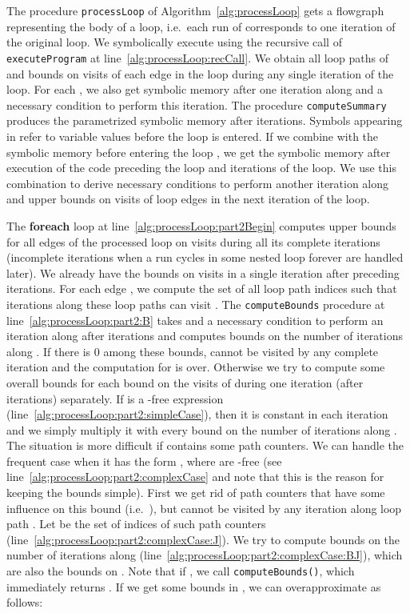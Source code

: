 \documentclass[10pt,a4paper]{article}
\begin{document}
The procedure \texttt{processLoop} of Algorithm~\ref{alg:processLoop} gets a
flowgraph  representing the body of a loop, i.e.~each run of 
corresponds to one iteration of the original loop. We symbolically execute
 using the recursive call of \texttt{executeProgram} at
line~\ref{alg:processLoop:recCall}. We obtain all loop paths
 of  and bounds  on visits
of each edge in the loop during any single iteration of the loop. For each
, we also get symbolic memory  after one iteration along
 and a necessary condition  to perform this iteration.
The procedure \texttt{computeSummary} produces the parametrized symbolic
memory  after
 iterations.
Symbols  appearing in  refer to variable
values before the loop is entered. If we combine 
with the symbolic memory before entering the loop , we
get the symbolic memory after execution of the code preceding the loop and
 iterations of the loop. We use this combination to derive
necessary conditions  to perform another iteration
along  and upper bounds  on visits of loop
edges in the next iteration of the loop. 

The \textbf{foreach} loop at
line~\ref{alg:processLoop:part2Begin} computes upper bounds for all edges of the processed loop on visits during
all its complete iterations (incomplete iterations when a run cycles in
some nested loop forever are handled later). We already have the bounds
 on visits in a single iteration after 
preceding iterations.
For each edge , we compute the set  of all loop path indices such that
iterations along these loop paths can visit . 
The \texttt{computeBounds} procedure at line~\ref{alg:processLoop:part2:B}
takes  and a necessary condition to perform an iteration along  after
 iterations and computes bounds  on the
number of iterations along . If there is 0 among these bounds,  cannot
be visited by any complete iteration and the computation for  is
over. Otherwise we try to compute some overall bounds for each bound
 on the visits of  during one iteration (after
 iterations) separately. If  is a
-free expression
(line~\ref{alg:processLoop:part2:simpleCase}), then it is constant in each
iteration and we simply multiply it with every bound on the number of
iterations along . The situation is more difficult if
 contains some path counters. We can handle the
frequent case when it has the form
, where  are
-free (see line~\ref{alg:processLoop:part2:complexCase} and
note that this is the reason for keeping the bounds simple). First we
get rid of path counters  that have some influence on this bound
(i.e.~), but  cannot be visited by any iteration along loop
path . Let  be the set of indices of such path counters
(line~\ref{alg:processLoop:part2:complexCase:J}). We try to compute bounds
 on the number of iterations along 
(line~\ref{alg:processLoop:part2:complexCase:BJ}), which are also the bounds
on . Note that if , we call
\texttt{computeBounds(}\texttt{)}, which immediately
returns . If we get some bounds in , we can overapproximate
 as follows:
\end{document}
